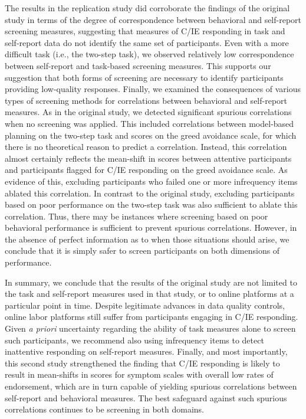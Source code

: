 \documentclass[a4paper,notitlepage,12pt]{article}
\begin{document}
\begin{refsection}[supp]
The results in the replication study did corroborate the findings of the original study in terms of the degree of correspondence between behavioral and self-report screening measures, suggesting that measures of C/IE responding in task and self-report data do not identify the same set of participants. Even with a more difficult task (i.e., the two-step task), we observed relatively low correspondence between self-report and task-based screening measures. This supports our suggestion that both forms of screening are necessary to identify participants providing low-quality responses. Finally, we examined the consequences of various types of screening methods for correlations between behavioral and self-report measures. As in the original study, we detected significant spurious correlations when no screening was applied. This included correlations between model-based planning on the two-step task and scores on the greed avoidance scale, for which there is no theoretical reason to predict a correlation. Instead, this correlation almost certainly reflects the mean-shift in scores between attentive participants and participants flagged for C/IE responding on the greed avoidance scale. As evidence of this, excluding participants who failed one or more infrequency items ablated this correlation. In contrast to the original study, excluding participants based on poor performance on the two-step task was also sufficient to ablate this correlation. Thus, there may be instances where screening based on poor behavioral performance is sufficient to prevent spurious correlations. However, in the absence of perfect information as to when those situations should arise, we conclude that it is simply safer to screen participants on both dimensions of performance. 

In summary, we conclude that the results of the original study are not limited to the task and self-report measures used in that study, or to online platforms at a particular point in time. Despite legitimate advances in data quality controls, online labor platforms still suffer from participants engaging in C/IE responding. Given \textit{a priori} uncertainty regarding the ability of task measures alone to screen such participants, we recommend also using infrequency items to detect inattentive responding on self-report measures. Finally, and most importantly, this second study strengthened the finding that C/IE responding is likely to result in mean-shifts in scores for symptom scales with overall low rates of endorsement, which are in turn capable of yielding spurious correlations between self-report and behavioral measures. The best safeguard against such spurious correlations continues to be screening in both domains. 


\end{refsection}
\end{document}
